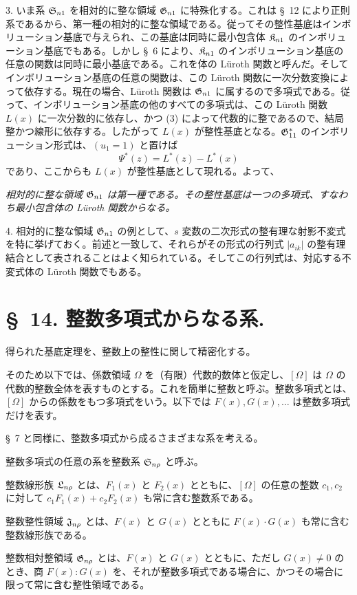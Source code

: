 \documentclass[11pt]{article}
\begin{document}
3. いま系 $\mathfrak{S}_{n1}$ を相対的に整な領域 $\mathfrak{G}_{n1}$ に特殊化する。これは \S\ 12 により正則系であるから、第一種の相対的に整な領域である。従ってその整性基底はインボリューション基底で与えられ、この基底は同時に最小包含体 $\mathfrak{K}_{n1}$ のインボリューション基底でもある。しかし \S\ 6 により、$\mathfrak{K}_{n1}$ のインボリューション基底の任意の関数は同時に最小基底である。これを体の Lüroth 関数と呼んだ。そしてインボリューション基底の任意の関数は、この Lüroth 関数に一次分数変換によって依存する。現在の場合、Lüroth 関数は $\mathfrak{G}_{n1}$ に属するので多項式である。従って、インボリューション基底の他のすべての多項式は、この Lüroth 関数 $L(x)$ に一次分数的に依存し、かつ (3) によって代数的に整であるので、結局整かつ線形に依存する。したがって $L(x)$ が整性基底となる。$\mathfrak{G}^*_{11}$ のインボリューション形式は、$(u_1=1)$ と置けば
\[
  \Psi^*(z)=L^*(z)-L^*(x)
\]
であり、ここからも $L(x)$ が整性基底として現れる。よって、

\emph{相対的に整な領域 $\mathfrak{G}_{n1}$ は第一種である。その整性基底は一つの多項式、すなわち最小包含体の Lüroth 関数からなる。}

4. 相対的に整な領域 $\mathfrak{G}_{n1}$ の例として、$s$ 変数の二次形式の整有理な射影不変式を特に挙げておく。前述と一致して、それらがその形式の行列式 $|a_{ik}|$ の整有理結合として表されることはよく知られている。そしてこの行列式は、対応する不変式体の Lüroth 関数でもある。

\section*{\S\ 14. 整数多項式からなる系.}

得られた基底定理を、整数上の整性に関して精密化する。

そのため以下では、係数領域 $\Omega$ を（有限）代数的数体と仮定し、$[\Omega]$ は $\Omega$ の代数的整数全体を表すものとする。これを簡単に整数と呼ぶ。整数多項式とは、$[\Omega]$ からの係数をもつ多項式をいう。以下では $F(x),G(x),\ldots$ は整数多項式だけを表す。

\S\ 7 と同様に、整数多項式から成るさまざまな系を考える。

整数多項式の任意の系を整数系 $\mathfrak{S}_{n\rho}$ と呼ぶ。

整数線形族 $\mathfrak{L}_{n\rho}$ とは、$F_1(x)$ と $F_2(x)$ とともに、$[\Omega]$ の任意の整数 $c_1,c_2$ に対して $c_1F_1(x)+c_2F_2(x)$ も常に含む整数系である。

整数整性領域 $\mathfrak{J}_{n\rho}$ とは、$F(x)$ と $G(x)$ とともに $F(x)\cdot G(x)$ も常に含む整数線形族である。

整数相対整領域 $\mathfrak{G}_{n\rho}$ とは、$F(x)$ と $G(x)$ とともに、ただし $G(x)\ne0$ のとき、商 $F(x):G(x)$ を、それが整数多項式である場合に、かつその場合に限って常に含む整性領域である。
\end{document}
